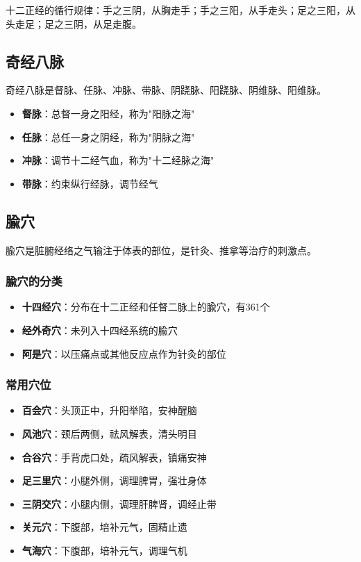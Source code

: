 \documentclass[12pt,UTF8]{ctexbook}
\begin{document}
十二正经的循行规律：手之三阴，从胸走手；手之三阳，从手走头；足之三阳，从头走足；足之三阴，从足走腹。

\subsection{奇经八脉}

奇经八脉是督脉、任脉、冲脉、带脉、阴跷脉、阳跷脉、阴维脉、阳维脉。

\begin{itemize}
\item \textbf{督脉}：总督一身之阳经，称为"阳脉之海"
\item \textbf{任脉}：总任一身之阴经，称为"阴脉之海"
\item \textbf{冲脉}：调节十二经气血，称为"十二经脉之海"
\item \textbf{带脉}：约束纵行经脉，调节经气
\end{itemize}

\subsection{腧穴}

腧穴是脏腑经络之气输注于体表的部位，是针灸、推拿等治疗的刺激点。

\subsubsection{腧穴的分类}

\begin{itemize}
\item \textbf{十四经穴}：分布在十二正经和任督二脉上的腧穴，有361个
\item \textbf{经外奇穴}：未列入十四经系统的腧穴
\item \textbf{阿是穴}：以压痛点或其他反应点作为针灸的部位
\end{itemize}

\subsubsection{常用穴位}

\begin{itemize}
\item \textbf{百会穴}：头顶正中，升阳举陷，安神醒脑
\item \textbf{风池穴}：颈后两侧，祛风解表，清头明目
\item \textbf{合谷穴}：手背虎口处，疏风解表，镇痛安神
\item \textbf{足三里穴}：小腿外侧，调理脾胃，强壮身体
\item \textbf{三阴交穴}：小腿内侧，调理肝脾肾，调经止带
\item \textbf{关元穴}：下腹部，培补元气，固精止遗
\item \textbf{气海穴}：下腹部，培补元气，调理气机
\end{itemize}
\end{document}
